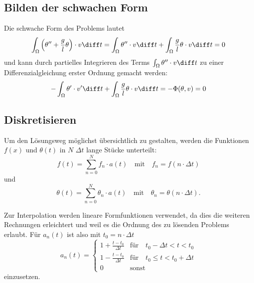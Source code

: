 \subsection{Bilden der schwachen Form}
Die schwache Form des Problems lautet
\begin{equation}
    \int_\Omega \left( \theta'' + \frac{g}{l} \theta \right) \cdot v \diff t 
    = \int_\Omega \theta'' \cdot v \diff t + \int_\Omega \frac{g}{l} \theta \cdot v \diff t
    = 0
\end{equation}
und kann durch partielles Integrieren des Terms $\int_\Omega \theta'' \cdot v \diff t$ zu einer Differenzialgleichung erster Ordnung gemacht werden:
\begin{equation}
    - \int_\Omega \theta' \cdot v' \diff t + \int_\Omega \frac{g}{l} \theta \cdot v \diff t = -\Phi(\theta, v) = 0
    \label{fem:rechenbsp:schwache_form}
\end{equation}


\subsection{Diskretisieren}
Um den Lösungsweg möglichst übersichtlich zu gestalten, werden die Funktionen $f(x)$ und $\theta(t)$ in $N$ $\Delta t$ lange Stücke unterteilt:
\begin{equation}
    f(t) = \sum_{n=0}^{N} f_n \cdot a(t) \quad
    \text{mit} \quad
    f_n = f(n \cdot \Delta t)
\end{equation}
und
\begin{equation}
    \theta(t) = \sum_{n=0}^{N} \theta_n \cdot a(t) \quad
    \text{mit} \quad
    \theta_n = \theta(n \cdot \Delta t).
\end{equation}

Zur Interpolation werden lineare Formfunktionen verwendet, da dies die weiteren Rechnungen erleichtert und weil es die Ordnung des zu lösenden Problems erlaubt.
Für $a_n(t)$ ist also mit $t_0 = n \cdot \Delta t$
\begin{equation}
    a_n(t) = \left\{ \begin{array}{ll}
        1+\frac{t-t_0}{\Delta t} & \text{für} \quad t_0 - \Delta t < t < t_0 \\
        1-\frac{t-t_0}{\Delta t} & \text{für} \quad t_0 \leq t < t_0 + \Delta t \\
        0 & \text{sonst}
    \end{array} \right.
\end{equation}
einzusetzen.


